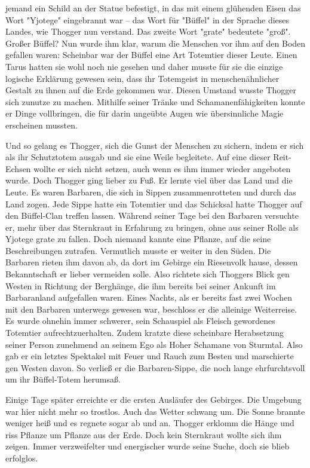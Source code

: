 \documentclass[10pt, a4paper, oneside]{book}
\begin{document}
\begin{multicols}{2}
jemand ein Schild an der Statue befestigt, in das mit einem glühenden Eisen das Wort "Yjotege" eingebrannt war – das Wort für "Büffel" in der Sprache dieses Landes, wie Thogger nun verstand. Das zweite Wort "grate" bedeutete "groß". Großer Büffel? Nun wurde ihm klar, warum die Menschen vor ihm auf den Boden gefallen waren: Scheinbar war der Büffel eine Art Totemtier dieser Leute. Einen Tarus hatten sie wohl noch nie gesehen und daher musste für sie die einzige logische Erklärung gewesen sein, dass ihr Totemgeist in menschenähnlicher Gestalt zu ihnen auf die Erde gekommen war. Diesen Umstand wusste Thogger sich zunutze zu machen. Mithilfe seiner Tränke und Schamanenfähigkeiten konnte 
er Dinge vollbringen, die für darin ungeübte Augen wie übersinnliche Magie erscheinen mussten.\bigskip

Und so gelang es Thogger, sich die Gunst der Menschen zu sichern, indem er sich als ihr Schutztotem ausgab und sie eine Weile begleitete. Auf eine dieser Reit-Echsen wollte er sich nicht setzen, auch wenn es ihm immer wieder angeboten wurde. Doch Thogger ging lieber zu Fuß. Er lernte viel über das Land und die Leute. Es waren Barbaren, die sich in Sippen zusammenrotteten und durch das Land zogen. Jede Sippe hatte ein Totemtier und das Schicksal hatte Thogger auf den Büffel-Clan treffen lassen. Während seiner Tage bei den Barbaren versuchte er, mehr über das Sternkraut in Erfahrung zu bringen, ohne aus seiner Rolle als Yjotege grate zu fallen. Doch niemand kannte eine Pflanze, auf die seine Beschreibungen zutrafen. Vermutlich musste er weiter in den Süden. Die Barbaren rieten ihm davon ab, da dort im Gebirge ein Riesenvolk hause, dessen Bekanntschaft er lieber vermeiden solle. Also richtete sich Thoggers Blick gen Westen in Richtung der Berghänge, die ihm bereits bei seiner Ankunft im Barbaranland aufgefallen waren. Eines Nachts, als er bereits fast zwei Wochen mit den Barbaren unterwegs gewesen war, beschloss er die alleinige Weiterreise. Es wurde ohnehin immer schwerer, sein Schauspiel als Fleisch gewordenes Totemtier aufrechtzuerhalten. Zudem kratzte diese scheinbare Herabsetzung seiner Person zunehmend an seinem Ego als Hoher Schamane von Sturmtal. Also gab er ein letztes Spektakel mit Feuer und Rauch zum Besten und marschierte gen Westen davon. So verließ er die Barbaren-Sippe, die noch lange ehrfurchtsvoll um ihr Büffel-Totem herumsaß.\bigskip

Einige Tage später erreichte er die ersten Ausläufer des Gebirges. Die Umgebung war hier nicht mehr so trostlos. Auch das Wetter schwang um. Die Sonne brannte weniger heiß und es regnete sogar ab und an. Thogger erklomm die Hänge und riss Pflanze um Pflanze aus der Erde. Doch kein Sternkraut wollte sich ihm zeigen. Immer verzweifelter und energischer wurde seine Suche, doch sie blieb erfolglos.\bigskip


\end{multicols}
\end{document}
